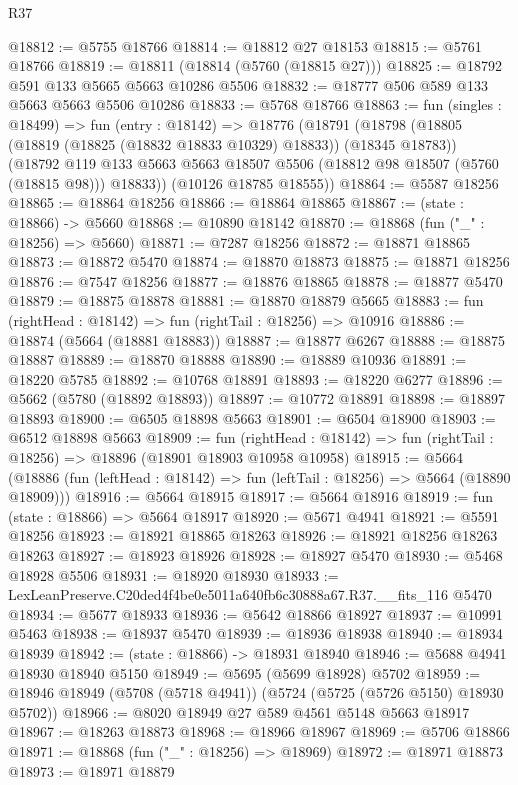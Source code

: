 \begin{lexlean}{R37}
\begin{coremodule}
@18812 := @5755 @18766
@18814 := @18812 @27 @18153
@18815 := @5761 @18766
@18819 := @18811 (@18814 (@5760 (@18815 @27)))
@18825 := @18792 @591 @133 @5665 @5663 @10286 @5506
@18832 := @18777 @506 @589 @133 @5663 @5663 @5506 @10286
@18833 := @5768 @18766
@18863 := fun (singles : @18499) =>
  fun (entry : @18142) =>
  @18776
    (@18791
      (@18798
        (@18805 (@18819 (@18825 (@18832 @18833 @10329) @18833)) (@18345 @18783))
        (@18792 @119 @133 @5663 @5663 @18507 @5506 (@18812 @98 @18507 (@5760 (@18815 @98))) @18833))
      (@10126 @18785 @18555))
@18864 := @5587 @18256
@18865 := @18864 @18256
@18866 := @18864 @18865
@18867 := (state : @18866) -> @5660
@18868 := @10890 @18142
@18870 := @18868 (fun ("_" : @18256) => @5660)
@18871 := @7287 @18256
@18872 := @18871 @18865
@18873 := @18872 @5470
@18874 := @18870 @18873
@18875 := @18871 @18256
@18876 := @7547 @18256
@18877 := @18876 @18865
@18878 := @18877 @5470
@18879 := @18875 @18878
@18881 := @18870 @18879 @5665
@18883 := fun (rightHead : @18142) => fun (rightTail : @18256) => @10916
@18886 := @18874 (@5664 (@18881 @18883))
@18887 := @18877 @6267
@18888 := @18875 @18887
@18889 := @18870 @18888
@18890 := @18889 @10936
@18891 := @18220 @5785
@18892 := @10768 @18891
@18893 := @18220 @6277
@18896 := @5662 (@5780 (@18892 @18893))
@18897 := @10772 @18891
@18898 := @18897 @18893
@18900 := @6505 @18898 @5663
@18901 := @6504 @18900
@18903 := @6512 @18898 @5663
@18909 := fun (rightHead : @18142) =>
  fun (rightTail : @18256) => @18896 (@18901 @18903 @10958 @10958)
@18915 := @5664
    (@18886 (fun (leftHead : @18142) => fun (leftTail : @18256) => @5664 (@18890 @18909)))
@18916 := @5664 @18915
@18917 := @5664 @18916
@18919 := fun (state : @18866) => @5664 @18917
@18920 := @5671 @4941
@18921 := @5591 @18256
@18923 := @18921 @18865 @18263
@18926 := @18921 @18256 @18263 @18263
@18927 := @18923 @18926
@18928 := @18927 @5470
@18930 := @5468 @18928 @5506
@18931 := @18920 @18930
@18933 := LexLeanPreserve.C20ded4f4be0e5011a640fb6c30888a67.R37.__fits_116 @5470
@18934 := @5677 @18933
@18936 := @5642 @18866 @18927
@18937 := @10991 @5463
@18938 := @18937 @5470
@18939 := @18936 @18938
@18940 := @18934 @18939
@18942 := (state : @18866) -> @18931 @18940
@18946 := @5688 @4941 @18930 @18940 @5150
@18949 := @5695 (@5699 @18928) @5702
@18959 := @18946 @18949 (@5708 (@5718 @4941)) (@5724 (@5725 (@5726 @5150) @18930 @5702))
@18966 := @8020 @18949 @27 @589 @4561 @5148 @5663 @18917
@18967 := @18263 @18873
@18968 := @18966 @18967
@18969 := @5706 @18866
@18971 := @18868 (fun ("_" : @18256) => @18969)
@18972 := @18971 @18873
@18973 := @18971 @18879

\end{coremodule}
\end{lexlean}
